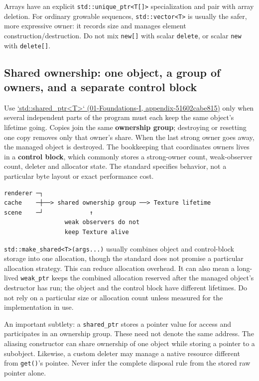 Arrays have an explicit \texttt{std::unique\_ptr\textless{}T{[}{]}\textgreater{}} specialization and pair with array deletion. For ordinary growable sequences, \texttt{std::vector\textless{}T\textgreater{}} is usually the safer, more expressive owner: it records size and manages element construction/destruction. Do not mix \texttt{new{[}{]}} with scalar \texttt{delete}, or scalar \texttt{new} with \texttt{delete{[}{]}}.

\subsection{Shared ownership: one object, a group of owners, and a separate control block}\label{05-engine-i-ch004-shared-ownership-one-object-a-group-of-owners-and-a-separate-control-block}

Use \href{../01-Foundations-I/main.pdf\#nameddest=appendix-51602cabe815}{`std::shared\_ptr\textless T\textgreater` (01-Foundations-I, appendix-51602cabe815)} only when several independent parts of the program must each keep the same object's lifetime going. Copies join the same \textbf{ownership group}; destroying or resetting one copy removes only that owner's share. When the last strong owner goes away, the managed object is destroyed. The bookkeeping that coordinates owners lives in a \textbf{control block}, which commonly stores a strong-owner count, weak-observer count, deleter and allocator state. The standard specifies behavior, not a particular byte layout or exact performance cost.

\begin{verbatim}
renderer ─┐
cache    ─┼──> shared ownership group ──> Texture lifetime
scene    ─┘             ↑
                 weak observers do not
                 keep Texture alive
\end{verbatim}

\texttt{std::make\_shared\textless{}T\textgreater{}(args...)} usually combines object and control-block storage into one allocation, though the standard does not promise a particular allocation strategy. This can reduce allocation overhead. It can also mean a long-lived \texttt{weak\_ptr} keeps the combined allocation reserved after the managed object's destructor has run; the object and the control block have different lifetimes. Do not rely on a particular size or allocation count unless measured for the implementation in use.

An important subtlety: a \texttt{shared\_ptr} stores a pointer value for access and participates in an ownership group. These need not denote the same address. The aliasing constructor can share ownership of one object while storing a pointer to a subobject. Likewise, a custom deleter may manage a native resource different from \texttt{get()}'s pointee. Never infer the complete disposal rule from the stored raw pointer alone.

